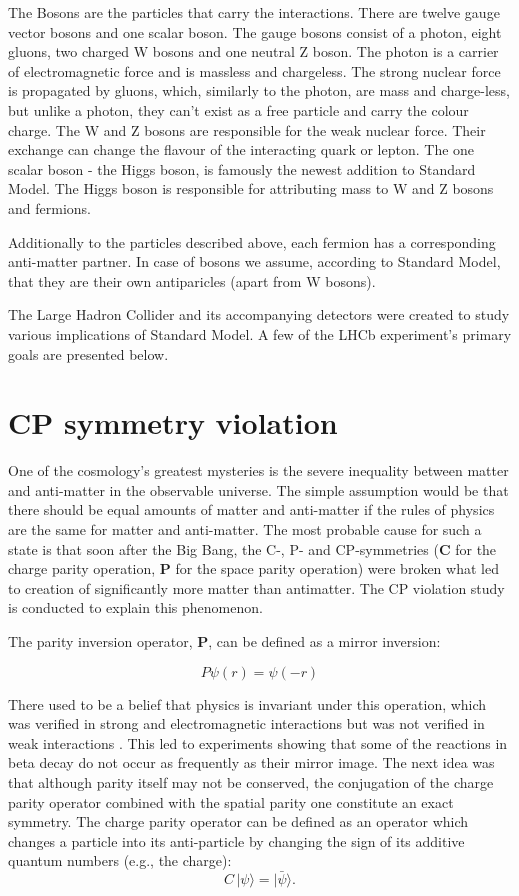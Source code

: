 The Bosons are the particles that carry the interactions. There are twelve gauge vector bosons and one scalar boson.
The gauge bosons consist of a photon, eight gluons, two charged W bosons and one neutral Z boson.
The photon is a carrier of electromagnetic force and is massless and chargeless.
The strong nuclear force is propagated by gluons, which, similarly to the photon, are mass and charge-less, but unlike a photon, they can't exist as a free particle and carry the colour charge.
The W and Z bosons are responsible for the weak nuclear force.
Their exchange can change the flavour of the interacting quark or lepton.
The one scalar boson - the Higgs boson, is famously the newest addition to Standard Model.
The Higgs boson is responsible for attributing mass to W and Z bosons and fermions.

Additionally to the particles described above, each fermion has a corresponding anti-matter partner. In case of bosons we assume, according to Standard Model, that they are their own antiparicles (apart from W bosons).

The Large Hadron Collider and its accompanying detectors were created to study various implications of Standard Model. A few of the LHCb experiment's primary goals are presented below.


\section{CP symmetry violation}
One of the cosmology's greatest mysteries is the severe inequality between matter and anti-matter in the observable universe. The simple assumption would be that there should be equal amounts of matter and anti-matter if the rules of physics are the same for matter and anti-matter.
The most probable cause for such a state is that soon after the Big Bang, the C-, P- and CP-symmetries (\textbf{C} for the charge parity operation, \textbf{P} for the space parity operation) were broken what led to creation of significantly more matter than antimatter.
The CP violation study is conducted to explain this phenomenon.

The parity inversion operator, \textbf{P}, can be defined as a mirror inversion:

$$
P\psi(r) = \psi(-r)
$$

There used to be a belief that physics is invariant under this operation, which was verified in strong and electromagnetic interactions but was not verified in weak interactions \cite{PhysRev.104.254}.
This led to experiments showing that some of the reactions in beta decay do not occur as frequently as their mirror image.
The next idea was that although parity itself may not be conserved, the conjugation of the charge parity operator combined with the spatial parity one constitute an exact symmetry.
The charge parity operator can be defined as an operator which changes a particle into its anti-particle by changing the sign of its additive quantum numbers (e.g., the charge):
$$
C \, |\psi\rangle = | \bar{\psi}\rangle.
$$

